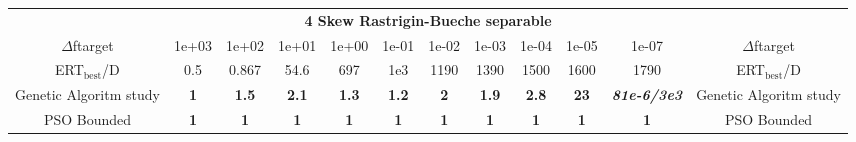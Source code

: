 \begin{tabular}{cccccccccccc}
 & \multicolumn{10}{c}{{\normalsize \textbf{4 Skew Rastrigin-Bueche separable}}}\\
$\Delta$ftarget& 1e+03& 1e+02& 1e+01& 1e+00& 1e-01& 1e-02& 1e-03& 1e-04& 1e-05& 1e-07 & $\Delta$ftarget \\
ERT$_{\textrm{best}}$/D& 0.5& 0.867& 54.6& 697& 1e3& 1190& 1390& 1500& 1600& 1790 & ERT$_{\textrm{best}}$/D \\
\hline
Genetic Algoritm study & \textbf{1} & \textbf{1.5} & \textbf{2.1} & \textbf{1.3} & \textbf{1.2} & \textbf{2} & \textbf{1.9} & \textbf{2.8} & \textbf{23} & \textbf{\textit{81e-6}\textit{/3e3}} & Genetic Algoritm study \cite{add_an_entry_for_Genetic Algoritm study_in_bbob.bib}\\
PSO Bounded & \textbf{1} & \textbf{1} & \textbf{1} & \textbf{1} & \textbf{1} & \textbf{1} & \textbf{1} & \textbf{1} & \textbf{1} & \textbf{1} & PSO Bounded \cite{add_an_entry_for_PSO Bounded_in_bbob.bib}
\end{tabular}
